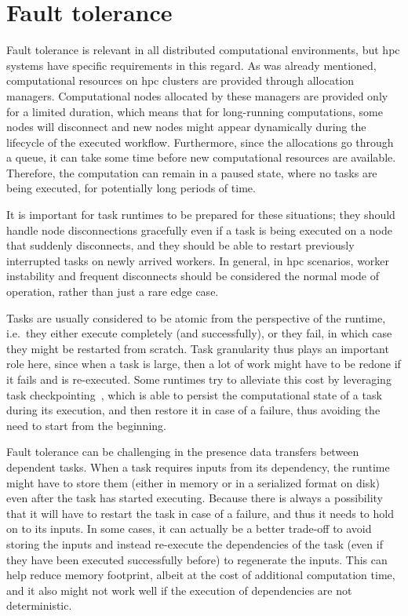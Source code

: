 \section{Fault tolerance}
Fault tolerance is relevant in all distributed computational environments, but
\gls{hpc} systems have specific requirements in this regard. As was already
mentioned, computational resources on \gls{hpc} clusters are provided through
allocation managers. Computational nodes allocated by these managers are provided only for a
limited duration, which means that for long-running computations, some nodes will disconnect and
new nodes might appear dynamically during the lifecycle of the executed workflow. Furthermore,
since the allocations go through a queue, it can take some time before new computational resources
are available. Therefore, the computation can remain in a paused state, where no tasks are being
executed, for potentially long periods of time.

It is important for task runtimes to be prepared for these situations; they should handle node
disconnections gracefully even if a task is being executed on a node that suddenly disconnects, and
they should be able to restart previously interrupted tasks on newly arrived workers. In general,
in \gls{hpc} scenarios, worker instability and frequent disconnects should be
considered the normal mode of operation, rather than just a rare edge case.

Tasks are usually considered to be atomic from the perspective of the runtime, i.e.\ they either
execute completely (and successfully), or they fail, in which case they might be restarted from
scratch. Task granularity thus plays an important role here, since when a task is large, then a lot
of work might have to be redone if it fails and is re-executed. Some runtimes try to alleviate this
cost by leveraging task checkpointing~\cite{task_checkpointing}, which is able to persist the
computational state of a task during its execution, and then restore it in case of a failure, thus
avoiding the need to start from the beginning.

Fault tolerance can be challenging in the presence data transfers between dependent tasks. When a
task requires inputs from its dependency, the runtime might have to store them (either in memory or
in a serialized format on disk) even after the task has started executing. Because there is always
a possibility that it will have to restart the task in case of a failure, and thus it needs to hold
on to its inputs. In some cases, it can actually be a better trade-off to avoid storing the inputs
and instead re-execute the dependencies of the task (even if they have been executed successfully
before) to regenerate the inputs. This can help reduce memory footprint, albeit at the cost of
additional computation time, and it also might not work well if the execution of dependencies are
not deterministic.

